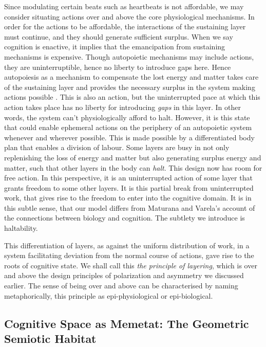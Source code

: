 Since modulating certain beats such as heartbeats is not affordable, we may consider situating actions over and above the core physiological mechanisms. In order for the actions to be affordable, the interactions of the sustaining layer must continue, and they should generate sufficient surplus. When we say cognition is enactive, it implies that the emancipation from sustaining mechanisms is expensive. Though autopoietic mechanisms may include actions, they are uninterruptible, hence no liberty to introduce gaps here. Hence autopoiesis as a mechanism to compensate the lost energy and matter takes care of the sustaining layer and provides the necessary surplus in the system making actions possible \cite{maturana1991autopoiesis}. This is also an action, but the uninterrupted pace at which this action takes place has no liberty for introducing \textit{gaps} in this layer. In other words, the system can't physiologically afford to halt. However, it is this state that could enable ephemeral actions on the periphery of an autopoietic system whenever and wherever possible. This is made possible by a differentiated body plan that enables a division of labour. Some layers are busy in not only replenishing the loss of energy and matter but also generating surplus energy and matter, such that other layers in the body can \textit{halt}. This design now has room for free action. In this perspective, it is an uninterrupted action of some layer that grants freedom to some other layers. It is this partial break from uninterrupted work, that gives rise to the freedom to enter into the cognitive domain. It is in this subtle sense, that our model differs from Maturana and Varela's account of the connections between biology and cognition. The subtlety we introduce is haltability.

This differentiation of layers, as against the uniform distribution of work, in a system facilitating deviation from the normal course of actions, gave rise to the roots of cognitive state. We shall call this \textit{the principle of layering}, which is over and above the design principles of polarization and asymmetry we discussed earlier. The sense of being over and above can be characterised by naming metaphorically, this principle as epi-physiological or epi-biological.

\subsection{Cognitive Space as Memetat: The Geometric Semiotic Habitat}
\label{subsec:memetat}

